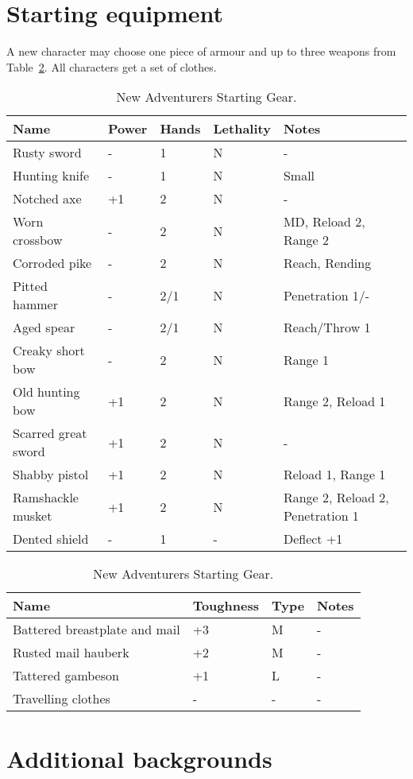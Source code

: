 \documentclass[a4paper,11pt,oneside]{book}
\begin{document}
\section{Starting equipment}
A new character may choose one piece of armour and up to three weapons from Table~\ref{tab:start-gear}. All characters get a set of clothes.
\begin{table}[ht!]
	\centering
	\caption{New Adventurers Starting Gear.}
	\label{tab:start-gear}
	\begin{tabular}{|l|l|l|l|l|}
		\hline
		Name & Power & Hands &  Lethality & Notes\\
		\hline
		Rusty sword & - & 1 & N & -\\
		Hunting knife & - & 1 & N & Small\\
		Notched axe & +1 & 2 & N & -\\
		Worn crossbow & - & 2 & N & MD, Reload 2, Range 2\\
		Corroded pike & - & 2 & N & Reach, Rending\\
		Pitted hammer & - & 2/1 & N & Penetration 1/- \\
		Aged spear & - & 2/1 & N & Reach/Throw 1\\
		Creaky short bow & - & 2 & N & Range 1\\
		Old hunting bow & +1 & 2 & N & Range 2, Reload 1\\
		Scarred great sword & +1 & 2 & N & -\\
		Shabby pistol & +1 & 2 & N & Reload 1, Range 1 \\
		Ramshackle musket & +1 & 2 & N & Range 2, Reload 2, Penetration 1 \\
		Dented shield & - & 1 & - & Deflect +1 \\
		\hline
	\end{tabular}
	\begin{tabular}{|l|l|l|l|}	
		\hline
		Name & Toughness & Type & Notes\\
		\hline
		Battered breastplate and mail & +3 & M & - \\
		Rusted mail hauberk & +2 & M & - \\
		Tattered gambeson & +1 & L & - \\
		Travelling clothes & - & - & - \\
		\hline
	\end{tabular}
\end{table}


\section{Additional backgrounds}
\end{document}
